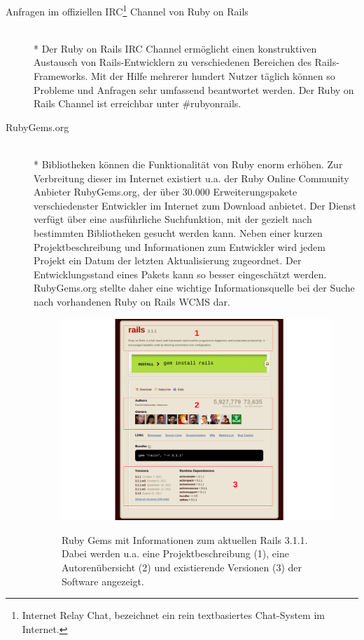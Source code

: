 \begin{description}
\item[Anfragen im offiziellen IRC\footnote{Internet Relay Chat, bezeichnet ein rein textbasiertes Chat-System im Internet.} Channel von Ruby on Rails]\mbox{~}\\*
Der Ruby on Rails IRC Channel ermöglicht einen konstruktiven Austausch von Rails-Entwicklern zu verschiedenen Bereichen des Rails-Frameworks. Mit der Hilfe mehrerer hundert Nutzer täglich können so Probleme und Anfragen sehr umfassend beantwortet werden. Der Ruby on Rails Channel ist erreichbar unter \#rubyonrails.
\item[RubyGems.org]\mbox{~}\\*
Bibliotheken können die Funktionalität von Ruby enorm erhöhen. Zur Verbreitung dieser im Internet existiert u.a. der Ruby Online Community Anbieter RubyGems.org, der über 30.000 Erweiterungspakete verschiedenster Entwickler im Internet zum Download anbietet.
Der Dienst verfügt über eine ausführliche Suchfunktion, mit der gezielt nach bestimmten Bibliotheken gesucht werden kann. Neben einer kurzen Projektbeschreibung und Informationen zum Entwickler wird jedem Projekt ein Datum der letzten Aktualisierung zugeordnet. Der Entwicklungsstand eines Pakets kann so besser eingeschätzt werden. RubyGems.org stellte daher eine wichtige Informationsquelle bei der Suche nach vorhandenen Ruby on Rails WCMS dar.
\begin{figure}[!h]
\begin{center}
\label{fig.rubygems}
\includegraphics[scale=0.6]{images/analyse/rubygems/railsonrubygems.pdf}
\caption[Ruby Gems mit Informationen zum aktuellen Rails 3.1.1]{Ruby Gems mit Informationen zum aktuellen Rails 3.1.1. Dabei werden u.a. eine Projektbeschreibung (1), eine Autorenübersicht (2) und existierende Versionen (3) der Software angezeigt.}

\end{center}
\end{figure}
\end{description}
